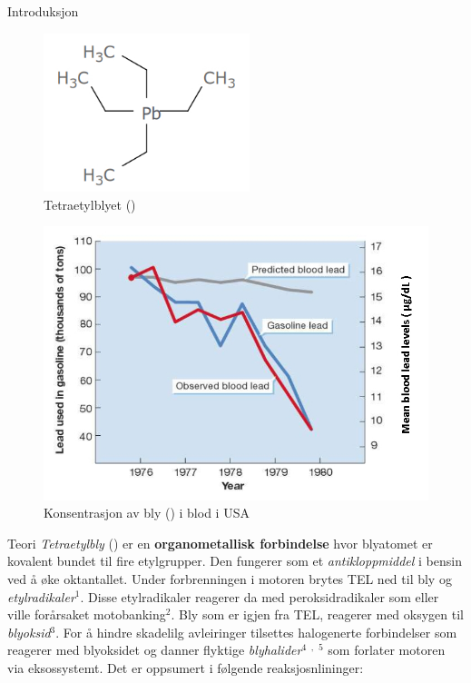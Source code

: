 \documentclass[final]{beamer}
\newlength{\colwidth}
\begin{document}
\begin{frame}[t]
\begin{columns}[t]
\begin{column}{\colwidth}
\begin{block}{Introduksjon}
				\begin{figure}[h!]
					\centering
					\vspace{0.5cm}
					\includegraphics[width=6cm]{./assets/tetraetylblyet.jpg}
					\caption{Tetraetylblyet ()}
				\end{figure}
				\begin{figure}[h!]
					\centering
					\vspace{-0.6cm}
					\includegraphics[width=12cm]{./assets/lead_in_gasoline_and_in_blood.jpg}
					\caption{Konsentrasjon av bly () i blod i USA}
				\end{figure}

			\end{block}

			\begin{block}{Teori}
				\textit{Tetraetylbly} () er en \textbf{organometallisk forbindelse} hvor
				blyatomet er kovalent bundet til fire etylgrupper. Den fungerer som et
				\textit{antikloppmiddel} i bensin ved å øke oktantallet. Under forbrenningen i motoren
				brytes TEL ned til bly og \textit{etylradikaler}$^1$. Disse etylradikaler reagerer da med
				peroksidradikaler som eller ville forårsaket motobanking$^2$. Bly som er igjen fra TEL,
				reagerer med oksygen til \textit{blyoksid}$^3$. For å hindre skadelilg avleiringer tilsettes
				halogenerte forbindelser som reagerer med blyoksidet og danner flyktige
				\textit{blyhalider}$^4$ $^,$ $^5$ som forlater motoren via eksossystemt. Det er oppsumert i
				følgende reaksjosnlininger:


\end{block}
\end{column}
\end{columns}
\end{frame}
\end{document}
